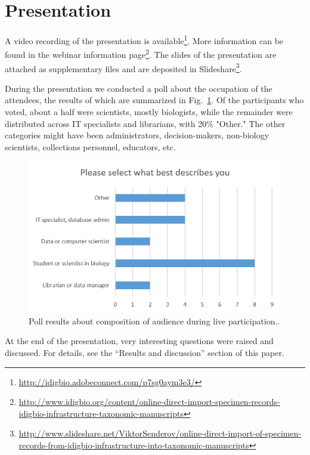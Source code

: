 \section{Presentation}

A video recording of the presentation is available\footnote{\url{http://idigbio.adobeconnect.com/p7sg0aym3e3/}}. More information can be found in the webinar information page\footnote{\url{http://www.idigbio.org/content/online-direct-import-specimen-records-idigbio-infrastructure-taxonomic-manuscripts}}. The slides of the presentation are attached as supplementary files and are deposited in Slideshare\footnote{\url{http://www.slideshare.net/ViktorSenderov/online-direct-import-of-specimen-records-from-idigbio-infrastructure-into-taxonomic-manuscripts}}.

During the presentation we conducted a poll about the occupation of the attendees, the results of which are summarized in Fig.~\ref{fig:webinar-poll}. Of the participants who voted, about a half were scientists, mostly biologists, while the remainder were distributed across IT specialists and librarians, with 20\% "Other." The other categories might have been administrators, decision-makers, non-biology scientists, collections personnel, educators, etc.

\begin{figure}
\centering
\includegraphics[width=\textwidth]{Figures/webinar-pool}
\decoRule
\caption{Poll results about composition of audience during live participation..}
\label{fig:webinar-poll}
\end{figure}

At the end of the presentation, very interesting questions were raised and discussed. For details, see the ``Results and discussion'' section of this paper.

